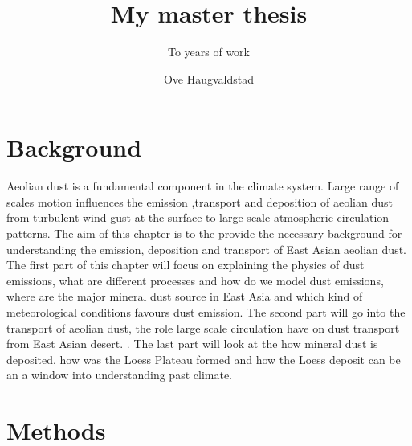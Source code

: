 \documentclass[a4paper,12pt,english]{report}
\title{My master thesis}
\subtitle{To years of work}
\author{Ove Haugvaldstad}
\begin{document}
\duoforside[program={Meteorology and Oceanography},
  dept={Section of Meteorology and Oceanography \and Department of Geoscience},
  long]
  
\tableofcontents

\newpage
\chapter{Background}
Aeolian dust is a fundamental component in the climate system. Large range of scales motion influences the emission 
,transport and deposition of aeolian dust from turbulent wind gust at the surface to large scale atmospheric circulation 
patterns. The aim of this chapter is to the provide the necessary background for understanding the emission, deposition 
and transport of East Asian aeolian dust. The first part of this chapter will focus on explaining the physics of dust 
emissions, what are different processes and how do we model dust emissions, where are the major mineral dust source in 
East Asia and which kind of meteorological conditions favours dust emission. The second part will go into the transport 
of aeolian dust, the role large scale circulation have on dust transport from East Asian desert. . The last part will look at the how mineral dust is deposited, how was the 
Loess Plateau formed and how the Loess deposit can be an a window into understanding past climate.   


\chapter{Methods}


\newpage
\printbibliography
\end{document}
